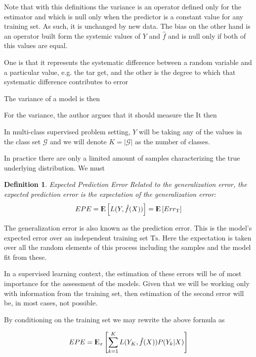 \documentclass{article}%
\newcommand{\calG}{\mathcal{G}}
\newcommand{\Expect}{{\rm I\kern-.3em E}}
\newtheorem{definition}{Definition}[subsection]
\theoremstyle{definition}
\begin{document}
 Note that with this definitions the variance is an operator defined only for the estimator and which is null only when the predictor is a constant value for any training set. As such, it is unchanged by new data. The bias on the other hand is an operator built form the systemic values of $Y$ and $\hat{f}$ and is null only if both of this values are equal.
 
 One is that it represents the systematic difference between a random
 variable and a particular value, e.g. the tar get, and the other is the degree
 to which that systematic difference contributes to error
 
 The variance of a model is then 
 
 For the variance, the author argues that it should measure the 
 It then 
 
 In multi-class supervised problem setting, $Y$ will be taking any of the values in the class set $\calG$ and we will denote $K = |\calG|$ as the number of classes.
 
 
 In practice there are only a limited amount of samples characterizing the true underlying distribution. We must 
 
 \begin{definition}{Expected Prediction Error}
 	Related to the generalization error, the expected prediction error is the expectation of the generalization error:
 	$$ EPE = \Expect \left[ L(Y,\hat{f}(X))\right] =  \Expect \left[ Err_{\mathrm{T}}  \right]$$
 \end{definition}
 
 The generalization error is also known as the prediction error. This is the model's expected error over an independent training set $\mathrm{Ts}$. Here the expectation is taken over all the random elements of this process including the samples and the model fit from these. 
 
 In a supervised learning context, the estimation of these errors will be of most importance for the assessment of the models.  Given  that we will be working only with information from the training set, then estimation of the second error will be, in most cases, not possible.
 
 By conditioning on the training set we may rewrite the above formula as 
 
 \begin{equation}\label{classificationEPE}
 EPE = \Expect_x\left[ \sum_{k=1}^{K} L( Y_K , \hat{f}(X) ) P(Y_k|X) \right]
 \end{equation}
 
\end{document}
